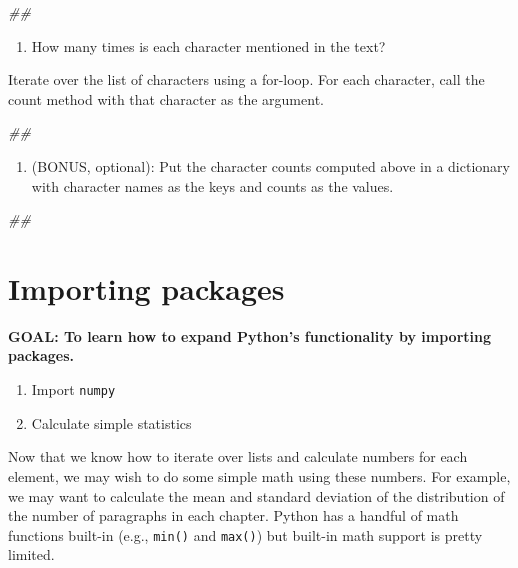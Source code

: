 \documentclass[]{book}
\newenvironment{Shaded}{\begin{snugshade}}{\end{snugshade}}
\newcommand{\CommentTok}[1]{\textcolor[rgb]{0.56,0.35,0.01}{\textit{#1}}}
\providecommand{\tightlist}{%
  \setlength{\itemsep}{0pt}\setlength{\parskip}{0pt}}
\begin{document}
\begin{Shaded}
\begin{Highlighting}[]
\CommentTok{##}
\end{Highlighting}
\end{Shaded}

\begin{enumerate}
\def\labelenumi{\arabic{enumi}.}
\setcounter{enumi}{2}
\tightlist
\item
  How many times is each character mentioned in the text?
\end{enumerate}

Iterate over the list of characters using a for-loop. For each
character, call the count method with that character as the argument.

\begin{Shaded}
\begin{Highlighting}[]
\CommentTok{##}
\end{Highlighting}
\end{Shaded}

\begin{enumerate}
\def\labelenumi{\arabic{enumi}.}
\setcounter{enumi}{3}
\tightlist
\item
  (BONUS, optional): Put the character counts computed above in a
  dictionary with character names as the keys and counts as the values.
\end{enumerate}

\begin{Shaded}
\begin{Highlighting}[]
\CommentTok{##}
\end{Highlighting}
\end{Shaded}

\section{Importing packages}\label{importing-packages}

\textbf{GOAL: To learn how to expand Python's functionality by importing
packages.}

\begin{enumerate}
\def\labelenumi{\arabic{enumi}.}
\tightlist
\item
  Import \texttt{numpy}
\item
  Calculate simple statistics
\end{enumerate}

Now that we know how to iterate over lists and calculate numbers for
each element, we may wish to do some simple math using these numbers.
For example, we may want to calculate the mean and standard deviation of
the distribution of the number of paragraphs in each chapter. Python has
a handful of math functions built-in (e.g., \texttt{min()} and
\texttt{max()}) but built-in math support is pretty limited.
\end{document}
